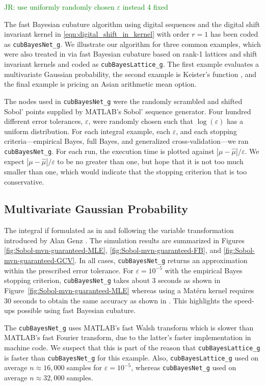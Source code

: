 \documentclass[graybox,footinfo]{svmult}
\newcommand{\hmu}{\widehat{\mu}}
\newcommand{\code}[1]{\texttt{#1}}
\def\abs#1{\ensuremath{\left \lvert #1 \right \rvert}}
\newcommand\figref{Figure~\ref}
\newcommand{\JRNote}[1]{{\textcolor{green}{JR: #1}}}
\begin{document}
\JRNote{use uniformly randomly chosen $\varepsilon$ instead 4 fixed}

The fast Bayesian cubature algorithm using digital sequences and the digital shift invariant kernel in \eqref{eqn:digital_shift_in_kernel} with order $r=1$ has been coded as \code{cubBayesNet\_g}.  We illustrate our algorithm for three common examples, which were also treated in \cite{RatHic19a} via fast Bayesian cubature based on rank-1 lattices and shift invariant kernels and coded as \code{cubBayesLattice\_g}. The first example evaluates a multivariate Gaussian probability, the second example is Keister's function \cite{Kei96}, and the final example is pricing an Asian arithmetic mean option.  

The nodes used in \code{cubBayesNet\_g} were the randomly scrambled and shifted Sobol' points supplied by MATLAB's Sobol' sequence generator. Four hundred different error tolerances, $\varepsilon$, were randomly chosen such that $\log(\varepsilon)$ has a uniform distribution. 
For each integral example, each $\varepsilon$, and each stopping criteria---empirical Bayes, full Bayes, and generalized cross-validation---we ran \code{cubBayesNet\_g}.  For each run, the execution time is plotted against $\abs{\mu - \hmu}/\varepsilon$.  We expect $\abs{\mu - \hmu}/\varepsilon$ to be no greater than one, but hope that it is not too much smaller than one, which would indicate that the stopping criterion that is too conservative.

\subsection{Multivariate Gaussian Probability}

The integral if formulated as in \cite{RatHic19a} and following the variable transformation introduced by Alan Genz \cite{Gen92}. The simulation results are summarized in Figures \ref{fig:Sobol-mvn-guaranteed-MLE}, \ref{fig:Sobol-mvn-guaranteed-FB}, and \ref{fig:Sobol-mvn-guaranteed-GCV}.  In all cases, \code{cubBayesNet\_g} returns an approximation within the prescribed error tolerance. For  $\varepsilon=10^{-5}$ with the empirical Bayes stopping criterion, \code{cubBayesNet\_g} takes about 3 seconds as shown in \figref{fig:Sobol-mvn-guaranteed-MLE} whereas using a Mat\'ern kernel requires 30 seconds to obtain the same accuracy as shown in \cite{RatHic19a}. This highlights the speed-ups possible using fast Bayesian cubature.

The \code{cubBayesNet\_g} uses MATLAB's fast Walsh transform which is slower than MATLAB's fast Fourier transform, due to the latter's faster implementation in machine code.  We suspect that this is part of the reason that \code{cubBayesLattice\_g} is faster than \code{cubBayesNet\_g} for this example.  Also, \code{cubBayesLattice\_g} used on average $n \approx 16{,}000$ samples for $\varepsilon = 10^{-5}$, whereas \code{cubBayesNet\_g} used on average $n \approx 32{,}000$ samples.
\end{document}
